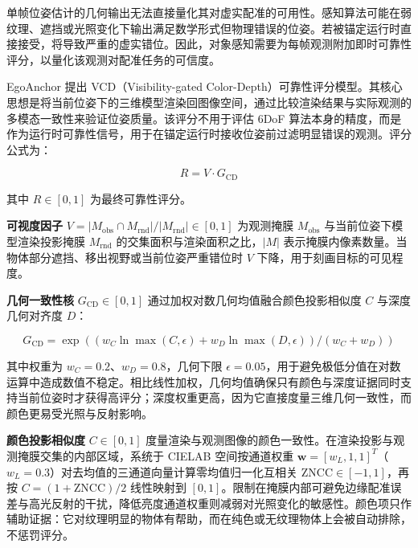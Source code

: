 \documentclass[review]{vgtc}
\begin{document}
单帧位姿估计的几何输出无法直接量化其对虚实配准的可用性。感知算法可能在弱纹理、遮挡或光照变化下输出满足数学形式但物理错误的位姿。若被锚定运行时直接接受，将导致严重的虚实错位。因此，对象感知需要为每帧观测附加即时可靠性评分，以量化该观测对配准任务的可信度。

EgoAnchor 提出 VCD（Visibility-gated Color-Depth）可靠性评分模型。其核心思想是将当前位姿下的三维模型渲染回图像空间，通过比较渲染结果与实际观测的多模态一致性来验证位姿质量。该评分不用于评估 6DoF 算法本身的精度，而是作为运行时可靠性信号，用于在锚定运行时接收位姿前过滤明显错误的观测。评分公式为：

\begin{equation}
R = V \cdot G_{\mathrm{CD}}
\label{eq:reliability}
\end{equation}


其中 $R \in [0,1]$ 为最终可靠性评分。

\textbf{可视度因子} $V = \lvert M_{\mathrm{obs}} \cap M_{\mathrm{rnd}} \rvert / \lvert M_{\mathrm{rnd}} \rvert \in [0,1]$ 为观测掩膜 $M_{\mathrm{obs}}$ 与当前位姿下模型渲染投影掩膜 $M_{\mathrm{rnd}}$ 的交集面积与渲染面积之比，$\lvert M \rvert$ 表示掩膜内像素数量。当物体部分遮挡、移出视野或当前位姿严重错位时 $V$ 下降，用于刻画目标的可见程度。

\textbf{几何一致性核} $G_{\mathrm{CD}} \in [0,1]$ 通过加权对数几何均值融合颜色投影相似度 $C$ 与深度几何对齐度 $D$：

\begin{equation}
G_{\mathrm{CD}} = \exp\!\left((w_C \ln \max\!\left(C, \epsilon\right) + w_D \ln \max\!\left(D, \epsilon\right)) / (w_C + w_D)\right)
\label{eq:cd-consistency}
\end{equation}


其中权重为 $w_C = 0.2$、$w_D = 0.8$，几何下限 $\epsilon = 0.05$，用于避免极低分值在对数运算中造成数值不稳定。相比线性加权，几何均值确保只有颜色与深度证据同时支持当前位姿时才获得高评分；深度权重更高，因为它直接度量三维几何一致性，而颜色更易受光照与反射影响。

\textbf{颜色投影相似度} $C \in [0,1]$ 度量渲染与观测图像的颜色一致性。在渲染投影与观测掩膜交集的内部区域，系统于 CIELAB 空间按通道权重 $\mathbf{w} = [w_L, 1, 1]^T$（$w_L = 0.3$）对去均值的三通道向量计算零均值归一化互相关 $\mathrm{ZNCC} \in [-1,1]$，再按 $C = (1 + \mathrm{ZNCC})/2$ 线性映射到 $[0,1]$。限制在掩膜内部可避免边缘配准误差与高光反射的干扰，降低亮度通道权重则减弱对光照变化的敏感性。颜色项只作辅助证据：它对纹理明显的物体有帮助，而在纯色或无纹理物体上会被自动排除，不惩罚评分。
\end{document}
